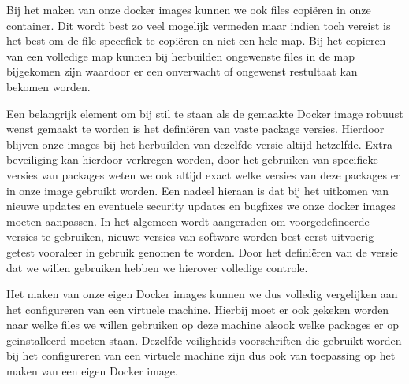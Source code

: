 Bij het maken van onze docker images kunnen we ook files copiëren in onze container. Dit wordt best zo veel mogelijk vermeden maar indien toch vereist is het best om de file specefiek te copiëren en niet een hele map. Bij het copieren van een volledige map kunnen bij herbuilden ongewenste files in de map bijgekomen zijn waardoor er een onverwacht of ongewenst restultaat kan bekomen worden. 

Een belangrijk element om bij stil te staan als de gemaakte Docker image robuust wenst gemaakt te worden is het definiëren van vaste package versies. Hierdoor blijven onze images bij het herbuilden van dezelfde versie altijd hetzelfde. Extra beveiliging kan hierdoor verkregen worden, door het gebruiken van specifieke versies van packages weten we ook altijd exact welke versies van deze packages er in onze image gebruikt worden. Een nadeel hieraan is dat bij het uitkomen van nieuwe updates en eventuele security updates en bugfixes we onze docker images moeten aanpassen. In het algemeen wordt aangeraden om voorgedefineerde versies te gebruiken, nieuwe versies van software worden best eerst uitvoerig getest vooraleer in gebruik genomen te worden. Door het definiëren van de versie dat we willen gebruiken hebben we hierover volledige controle.

Het maken van onze eigen Docker images kunnen we dus volledig vergelijken aan het configureren van een virtuele machine. Hierbij moet er ook gekeken worden naar welke files we willen gebruiken op deze machine alsook welke packages er op geinstalleerd moeten staan. Dezelfde veiligheids voorschriften die gebruikt worden bij het configureren van een virtuele machine zijn dus ook van toepassing op het maken van een eigen Docker image.


